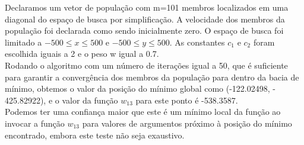 
Declaramos um vetor de população com m=101 membros localizados em uma diagonal do espaço de busca por simplificação. A velocidade dos membros da população foi declarada como sendo inicialmente zero. O espaço de busca foi limitado a $-500 \leq x \leq 500$ e $-500 \leq y \leq 500$. As constantes $c_1$ e $c_2$ foram escolhida iguais a 2 e o peso w igual a 0.7.\\

Rodando o algoritmo com um número de iterações igual a 50, que é suficiente para garantir a convergência dos membros da população para dentro da bacia de mínimo, obtemos o valor da posição do mínimo global como (-122.02498, - 425.82922), e o valor da função $w_{13}$ para este ponto é -538.3587.\\

Podemos ter uma confiança maior que este é um mínimo local da função ao invocar a função $w_{13}$ para valores de argumentos próximo à posição do mínimo encontrado, embora este teste não seja exaustivo.\\ 